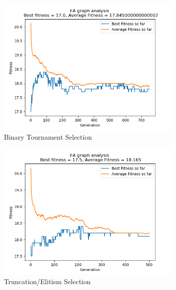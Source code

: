 \documentclass[conference,compsoc]{IEEEtran}
\begin{document}
\begin{figure}\ContinuedFloat
  \centering
  \begin{subfigure}{0.34\textwidth}
    \includegraphics[width=\linewidth]{../Results/_23_BT_Truncation_100_50_750.png}
    \caption{Binary Tournament Selection}
  \end{subfigure}
  \begin{subfigure}{0.34\textwidth}
    \includegraphics[width=\linewidth]{../Results/_23_Truncation_Truncation_100_50_500.png}
    \caption{Truncation/Elitism Selection}
  \end{subfigure}
  \begin{subfigure}{0.34\textwidth}

\end{subfigure}
\end{figure}
\end{document}

